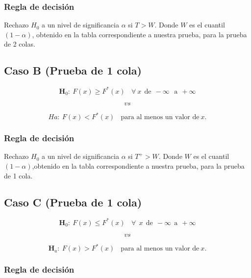 \documentclass[
  a4paper,
  oneside,
  openany]{book}
\begin{document}
\hypertarget{regla-de-decisiuxf3n-28}{%
\subsubsection*{Regla de decisión}\label{regla-de-decisiuxf3n-28}}


Rechazo \(H_0\) a un nivel de significancia \(\alpha\) si \(T>W\). Donde \(W\) es el cuantil \((1-\alpha)\), obtenido en la tabla correspondiente a nuestra prueba, para la prueba de 2 colas.

\hypertarget{caso-b-prueba-de-1-cola-1}{%
\subsection*{Caso B (Prueba de 1 cola)}\label{caso-b-prueba-de-1-cola-1}}


\[\textbf{H}_0: \ F(x) \geq F^*(x) \ \ \ \ \forall\ x\ \ \mbox{de} \ \ -\infty \  \ \  \mbox{a} \ \ +\infty\]

\[vs\]

\[Ha: \ F(x) < F^*(x) \ \ \ \ \mbox{para al menos un valor de} \  x.\]

\hypertarget{regla-de-decisiuxf3n-29}{%
\subsubsection*{Regla de decisión}\label{regla-de-decisiuxf3n-29}}


Rechazo \(H_0\) a un nivel de significancia \(\alpha\) si \(T^+>W\). Donde \(W\) es el cuantil \((1-\alpha)\),obtenido en la tabla correspondiente a nuestra prueba, para la prueba de 1 cola.

\hypertarget{caso-c-prueba-de-1-cola-1}{%
\subsection*{Caso C (Prueba de 1 cola)}\label{caso-c-prueba-de-1-cola-1}}


\[\textbf{H}_0:\ F(x) \leq F^*(x) \ \ \ \ \forall \ \ x \ \  \mbox{de} \  \ -\infty \ \  \mbox{a} \ \  +\infty\]

\[vs\]

\[\textbf{H}_a: \ F(x) > F^*(x) \ \ \ \ \mbox{para al menos un valor de} \  x.\]

\hypertarget{regla-de-decisiuxf3n-30}{%
\subsubsection*{Regla de decisión}\label{regla-de-decisiuxf3n-30}}
\end{document}
